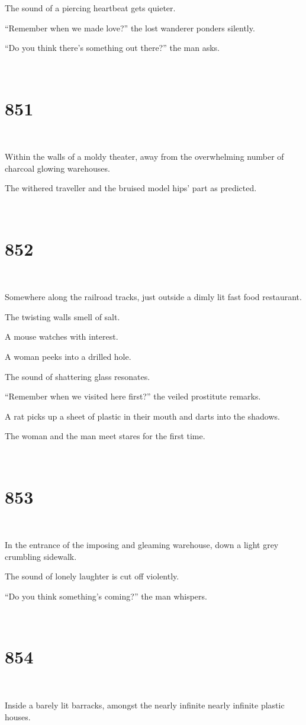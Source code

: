 \documentclass{report}
\begin{document}
The sound of a piercing heartbeat gets quieter.

``Remember when we made love?'' the lost wanderer ponders silently.

``Do you think there's something out there?'' the man asks.

~
\chapter*{851}
~

Within the walls of a moldy theater, away from the overwhelming number of charcoal glowing warehouses.

The withered traveller and the bruised model hips' part as predicted.

~
\chapter*{852}
~

Somewhere along the railroad tracks, just outside a dimly lit fast food restaurant.

The twisting walls smell of salt.

A mouse watches with interest.

A woman peeks into a drilled hole.

The sound of shattering glass resonates.

``Remember when we visited here first?'' the veiled prostitute remarks.

A rat picks up a sheet of plastic in their mouth and darts into the shadows.

The woman and the man meet stares for the first time.

~
\chapter*{853}
~

In the entrance of the imposing and gleaming warehouse, down a light grey crumbling sidewalk.

The sound of lonely laughter is cut off violently.

``Do you think something's coming?'' the man whispers.

~
\chapter*{854}
~

Inside a barely lit barracks, amongst the nearly infinite nearly infinite plastic houses.
\end{document}
